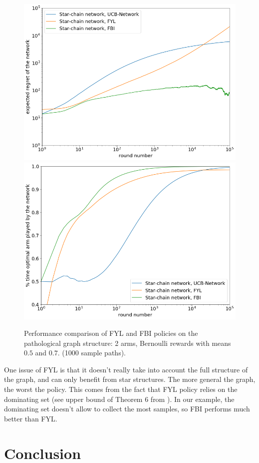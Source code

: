 \documentclass{article}
\begin{document}
\begin{figure}[H]
  \centering
  \includegraphics[width=0.49\linewidth]{fig5_1.png}
  \includegraphics[width=0.49\linewidth]{fig5_2.png}
  \caption{Performance comparison of FYL and FBI policies on the pathological graph structure: 2 arms, Bernoulli rewards with means $0.5$ and $0.7$. (1000 sample paths).}
\end{figure}

One issue of FYL is that it doesn't really take into account the full structure of the graph, and can only benefit from star structures. The more general the graph, the worst the policy. This comes from the fact that FYL policy relies on the dominating set (see upper bound of Theorem 6 from \cite{DBLP:journals/corr/KollaJG16}). In our example, the dominating set doesn't allow to collect the most samples, so FBI performs much better than FYL.

\section{Conclusion}


{\small


}
\end{document}
